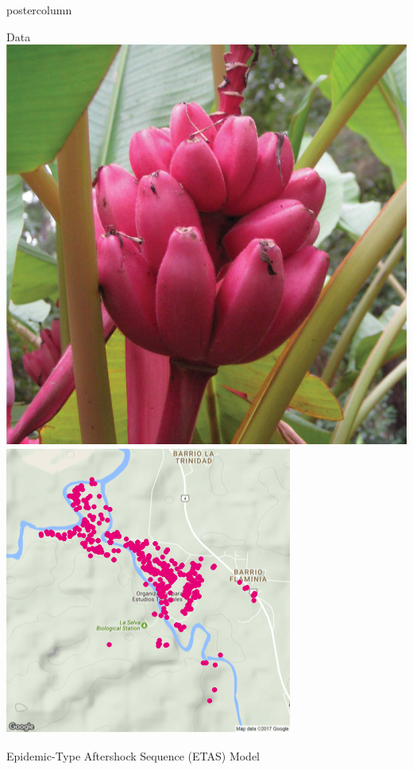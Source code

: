\documentclass[final]{beamer}\usepackage[]{graphicx}\usepackage[]{color}
\begin{document}
{\begin{frame}
\begin{columns}
\begin{column}{.33\textwidth}
\begin{beamercolorbox}[center,wd=\textwidth]{postercolumn}
\begin{minipage}[T]{.97\textwidth}
{\begin{block}{Data}
  \includegraphics[scale=0.276]{redbanana2.jpg}
  \hspace{1cm}
  \includegraphics[scale=0.724]{Plot of redbanana.png}
  \vspace{0.5cm}
	
\end{block}
\vfill


\begin{block}{Epidemic-Type Aftershock Sequence (ETAS) Model}


\end{block}}
\end{minipage}
\end{beamercolorbox}
\end{column}
\end{columns}
\end{frame}}
\end{document}
